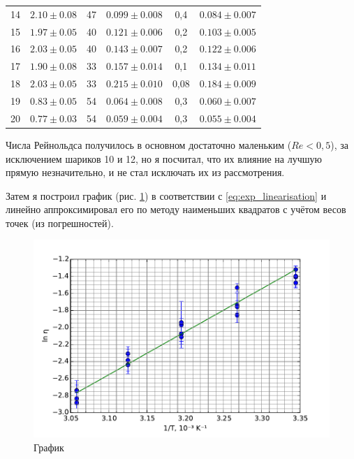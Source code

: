 \documentclass[12pt]{article}
\begin{document}
\begin{table}[h!]
\begin{center}
\begin{tabular}{|c|c|c|c|c|c|}
	14 & $2.10\pm 0.08$ & 47 & $0.099\pm 0.008$ & 0,4 & $0.084\pm 0.007$ \\
	15 & $1.97\pm 0.05$ & 40 & $0.121\pm 0.006$ & 0,2 & $0.103\pm 0.005$ \\
	16 & $2.03\pm 0.05$ & 40 & $0.143\pm 0.007$ & 0,2 & $0.122\pm 0.006$ \\
	17 & $1.90\pm 0.08$ & 33 & $0.157\pm 0.014$ & 0,1 & $0.134\pm 0.011$ \\
	18 & $2.03\pm 0.05$ & 33 & $0.215\pm 0.010$ & 0,08 & $0.184\pm 0.009$ \\
	19 & $0.83\pm 0.05$ & 54 & $0.064\pm 0.008$ & 0,3 & $0.060\pm 0.007$ \\
	20 & $0.77\pm 0.03$ & 54 & $0.059\pm 0.004$ & 0,3 & $0.055\pm 0.004$ \\
	\hline
	\end{tabular}
	\end{center}
	\end{table}
	
	Числа Рейнольдса получилось в основном достаточно маленьким ($Re<0{,}5$), за исключением шариков 10 и 12, но я посчитал, что их влияние на лучшую прямую незначительно, и не стал исключать их из рассмотрения.
	
	Затем я построил график (рис. \ref{fig:graph}) в соответствии с \eqref{eq:exp_linearisation} и линейно аппроксимировал его по методу наименьших квадратов с учётом весов точек (из погрешностей).
	
	\begin{figure}[h!]
	\caption{График}
	\label{fig:graph}
	\begin{center}
	\includegraphics[scale=0.7]{graph.pdf}
	\end{center}
	\end{figure}
	
\end{document}
